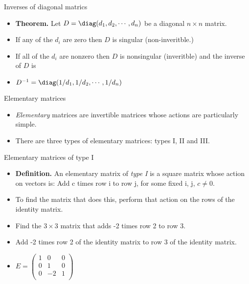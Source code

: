 \documentclass{beamer}
\begin{document}
\begin{frame}{Inverses of diagonal matrics}

\begin{itemize}
\item \textbf{Theorem.} Let $D=\diag(d_1,d_2,\cdots,d_n)$
be a diagonal $n\times n$ matrix.
\item If any of the $d_i$ are zero then $D$ is singular (non-inveritble.)
\item If all of the $d_i$ are nonzero then $D$ is nonsingular (inveritble)
and the inverse of $D$ is
\item $D^{-1}=\diag(1/d_1,1/d_2,\cdots,1/d_n)$
\end{itemize}
\end{frame}

\begin{frame}{Elementary matrices}

\begin{itemize}
\item \emph{Elementary} matrices are invertible matrices whose actions
are particularly simple.
\item There are three types of elementary matrices: types I, II and III.
\end{itemize}
\end{frame}

\begin{frame}{Elementary matrices of type I}

\begin{itemize}
\item \textbf{Definition.} An elementary matrix of \emph{type I} is a square
matrix whose action on vectors is: Add c times row i to row j, for some fixed
i, j, $c\not=0$.
\item To find the matrix that does this, perform that action on the
rows of the identity matrix.
\item Find the $3\times 3$ matrix that adds -2 times row 2 to row 3.
\item Add -2 times row 2 of the identity matrix to row 3 of the identity matrix.
\item $
E = \begin{pmatrix}
1 & 0 & 0 \\
0 & 1 & 0 \\
0 & -2 & 1 \\
\end{pmatrix}
$
\end{itemize}
\end{frame}
\end{document}
